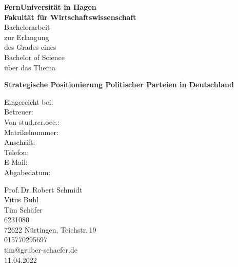 \documentclass[oneside,12pt,a4paper]{report}
\begin{document}
 
\begin{titlepage}
	\raggedright
	{\huge\bf FernUniversität in Hagen\\[0.5cm]}
	{\LARGE\bf Fakultät für Wirtschaftswissenschaft\\[1.5cm]}
	{\large\doublespacing
		Bachelorarbeit\\
		zur Erlangung\\
		\singlespacing des Grades eines\\
		Bachelor of Science\\
		\doublespacing über das Thema\\[2cm]
	}
	\begin{center}
	{\huge\bf Strategische Positionierung Politischer Parteien in Deutschland\\[3cm]}
	\end{center}
	\vfill
	\begin{minipage}{\textwidth}
		\doublespacing
		\parbox[t][4.5cm][t]{3.5cm}{
			Eingereicht bei:\\
			Betreuer:\\
			Von stud.rer.oec.:\\
			Matrikelnummer:\\
			Anschrift:\\
			Telefon:\\
			E-Mail:\\
			Abgabedatum:\\
		}\hfill
		\parbox[t][2cm][t]{11cm}{
			Prof.\,Dr.\,Robert Schmidt \\
			Vitus Bühl\\
			Tim Schäfer\\
			6231080\\
			72622 Nürtingen, Teichstr.\,19\\
			015770295697\\
			tim@gruber-schaefer.de\\
			11.04.2022
		}
	\end{minipage}
\end{titlepage}



\setcounter{page}{1}

\end{document}
